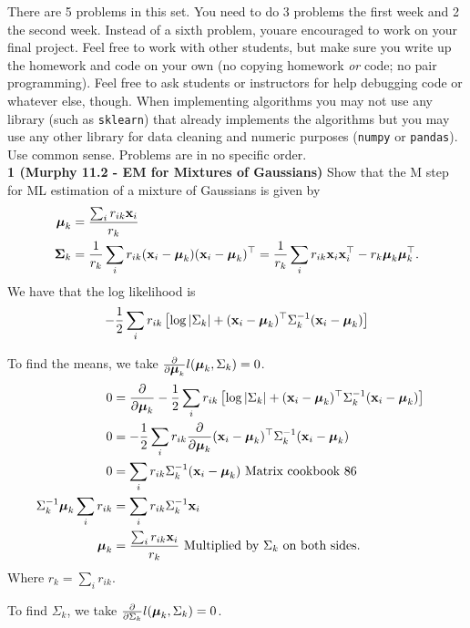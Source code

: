 \documentclass[12pt,letterpaper,fleqn]{hmcpset}
\begin{document}
There are 5 problems in this set. You need to do 3 problems the first week and 2 the second
week. Instead of a sixth problem, youare encouraged to work on your final project.
Feel free to work with other students, but make sure you write up the homework
and code on your own (no copying homework \textit{or} code; no pair programming).
Feel free to ask students or instructors for help debugging code or whatever else,
though.
When implementing algorithms you may not use any library (such as \texttt{sklearn})
that already implements the algorithms but you may use any other library for
data cleaning and numeric purposes (\texttt{numpy} or \texttt{pandas}). Use common
sense. Problems are in no specific order.\\[1em]

\textbf{1 (Murphy 11.2 - EM for Mixtures of Gaussians)} Show that the M step for ML
estimation of a mixture of Gaussians is given by
\begin{align*}
    \hbox{\boldmath$\mu$}_k &= \frac{\sum_i r_{ik}{\bf x}_i}{r_k}\\
    \hbox{\boldmath$\Sigma$}_k &= \frac{1}{r_k}\sum_i r_{ik}({\bf x}_i - \hbox{\boldmath$\mu$}_k)({\bf x}_i - \hbox{\boldmath$\mu$}_k)^\top = \frac{1}{r_k}\sum_i r_{ik}{\bf x}_i{\bf x}_i^\top - r_k\hbox{\boldmath$\mu$}_k\hbox{\boldmath$\mu$}_k^\top.
\end{align*}
\vspace{15mm}
We have that the log likelihood is $$ -\frac{1}{2} \sum_i r_{ik} \left[ \log|\Sigma_k| + ({\bf x}_i - \hbox{\boldmath$\mu$}_k)^\top \Sigma_k^{-1} ({\bf x}_i - \hbox{\boldmath$\mu$}_k) \right] $$

To find the means, we take $\frac{\partial}{\partial \hbox{\boldmath$\mu$}_k} l(\hbox{\boldmath$\mu$}_k, \Sigma_k) = 0$.
\begin{align*}
	0 &= \frac{\partial}{\partial \hbox{\boldmath$\mu$}_k} -\frac{1}{2} \sum_i r_{ik} \left[ \log|\Sigma_k| + ({\bf x}_i - \hbox{\boldmath$\mu$}_k)^\top \Sigma_k^{-1} ({\bf x}_i - \hbox{\boldmath$\mu$}_k) \right] \\
	0 &= -\frac{1}{2}  \sum_i r_{ik} \frac{\partial}{\partial \hbox{\boldmath$\mu$}_k} ({\bf x}_i - \hbox{\boldmath$\mu$}_k)^\top \Sigma_k^{-1} ({\bf x}_i - \hbox{\boldmath$\mu$}_k) &\\
	0 &= \sum_i r_{ik} \Sigma_{k}^{-1} ({\bf x}_i - \hbox{\boldmath$\mu$}_k) \text{  Matrix cookbook 86}\\
    \Sigma_{k}^{-1} \hbox{\boldmath$\mu$}_k \sum_i r_{ik} &= \sum_i r_{ik} \Sigma_{k}^{-1} {\bf x}_i \\
    \hbox{\boldmath$\mu$}_k &= \frac{\sum_i r_{ik}{\bf x}_i}{r_k} \text{ Multiplied by $\Sigma_{k}$ on both sides. }
\end{align*} 
Where $r_k =\sum_i r_{ik} $.

To find $\Sigma_k$, we take $\frac{\partial}{\partial \Sigma_k} l(\hbox{\boldmath$\mu$}_k, \Sigma_k) = 0$.
\end{document}
